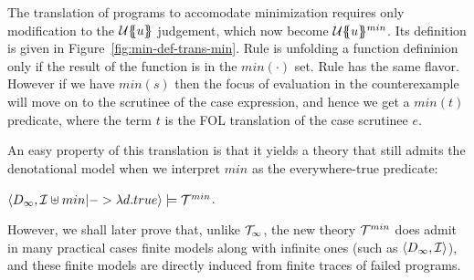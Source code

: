 
The translation of programs to accomodate minimization requires only modification
to the ${\cal U}\{\!\!\{u\}\!\!\}$ judgement, which now become ${\cal U}\{\!\!\{u\}\!\!\}^{min}$. Its definition
is given in Figure~\ref{fig:min-def-trans-min}. Rule  is unfolding a function
defininion only if the result of the function is in the $min(\cdot)$ set. Rule 
has the same flavor. However if we have $min(s)$ then the focus of evaluation in the counterexample
will move on to the scrutinee of the case expression, and hence we get a $min(t)$ predicate, where the
term $t$ is the FOL translation of the case scrutinee $e$.

An easy property of this translation is that it yields a theory that still admits the denotational model
when we interpret $min$ as the everywhere-true predicate:
\begin{theorem} $\langle D_\infty, {\cal I}\uplus min |-> \lambda d.true\rangle \models {\cal T}^{min}$. \end{theorem}

However, we shall later prove that, unlike ${\cal T}_\infty$, the new theory ${\cal T}^{min}$ does admit in many practical
cases finite models along with infinite ones (such as $\langle D_{\infty},{\cal I}\rangle$), and these finite
models are directly induced from finite traces of failed programs.



